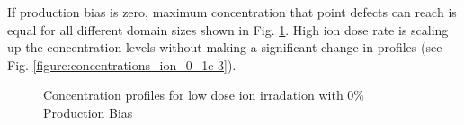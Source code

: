 \documentclass[a4paper]{article}
\begin{document}
    If production bias is zero, maximum concentration that point defects can reach is equal for all different domain sizes shown in Fig. \ref{figure:concentrations_ion_0_1e-6}. High ion dose rate is scaling up the concentration levels without making a significant change in profiles (see Fig. \ref{figure:concentrations_ion_0_1e-3}).
      \begin{figure}[h!]  %
        \centering
        \qquad
        \caption{Concentration profiles for low dose ion irradation with 0\% Production Bias}
        \label{figure:concentrations_ion_0_1e-6}
      \end{figure}
\end{document}
